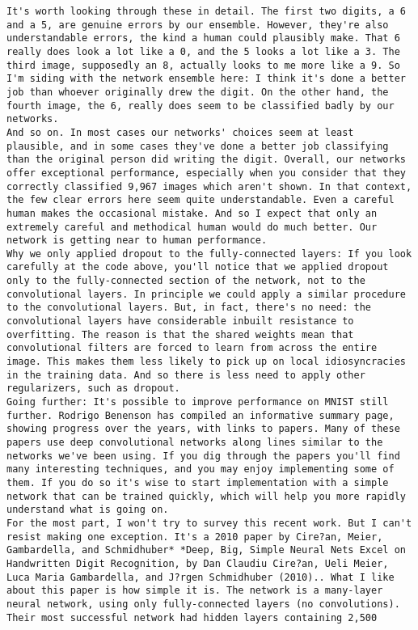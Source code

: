 \begin{lstlisting}
It's worth looking through these in detail. The first two digits, a 6 and a 5, are genuine errors by our ensemble. However, they're also understandable errors, the kind a human could plausibly make. That 6 really does look a lot like a 0, and the 5 looks a lot like a 3. The third image, supposedly an 8, actually looks to me more like a 9. So I'm siding with the network ensemble here: I think it's done a better job than whoever originally drew the digit. On the other hand, the fourth image, the 6, really does seem to be classified badly by our networks.
And so on. In most cases our networks' choices seem at least plausible, and in some cases they've done a better job classifying than the original person did writing the digit. Overall, our networks offer exceptional performance, especially when you consider that they correctly classified 9,967 images which aren't shown. In that context, the few clear errors here seem quite understandable. Even a careful human makes the occasional mistake. And so I expect that only an extremely careful and methodical human would do much better. Our network is getting near to human performance.
Why we only applied dropout to the fully-connected layers: If you look carefully at the code above, you'll notice that we applied dropout only to the fully-connected section of the network, not to the convolutional layers. In principle we could apply a similar procedure to the convolutional layers. But, in fact, there's no need: the convolutional layers have considerable inbuilt resistance to overfitting. The reason is that the shared weights mean that convolutional filters are forced to learn from across the entire image. This makes them less likely to pick up on local idiosyncracies in the training data. And so there is less need to apply other regularizers, such as dropout.
Going further: It's possible to improve performance on MNIST still further. Rodrigo Benenson has compiled an informative summary page, showing progress over the years, with links to papers. Many of these papers use deep convolutional networks along lines similar to the networks we've been using. If you dig through the papers you'll find many interesting techniques, and you may enjoy implementing some of them. If you do so it's wise to start implementation with a simple network that can be trained quickly, which will help you more rapidly understand what is going on.
For the most part, I won't try to survey this recent work. But I can't resist making one exception. It's a 2010 paper by Cire?an, Meier, Gambardella, and Schmidhuber* *Deep, Big, Simple Neural Nets Excel on Handwritten Digit Recognition, by Dan Claudiu Cire?an, Ueli Meier, Luca Maria Gambardella, and J?rgen Schmidhuber (2010).. What I like about this paper is how simple it is. The network is a many-layer neural network, using only fully-connected layers (no convolutions). Their most successful network had hidden layers containing 2,500

\end{lstlisting}
